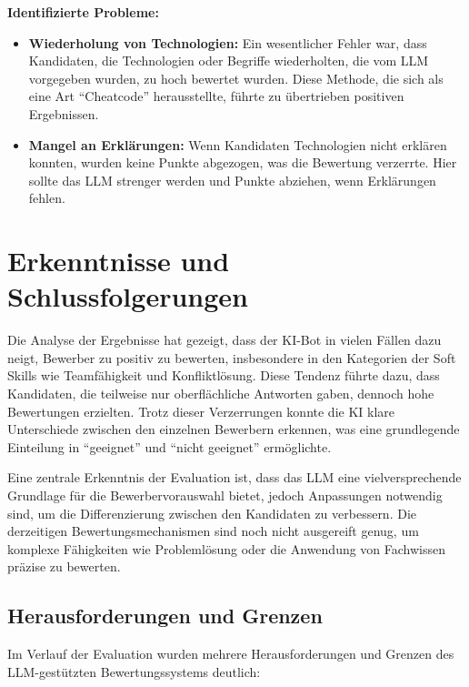 \textbf{Identifizierte Probleme:}

\begin{itemize}
    \item \textbf{Wiederholung von Technologien:} Ein wesentlicher Fehler war, dass Kandidaten, die Technologien oder Begriffe wiederholten, die vom \acs{LLM} vorgegeben wurden, zu hoch bewertet wurden. Diese Methode, die sich als eine Art ``Cheatcode''  herausstellte, führte zu übertrieben positiven Ergebnissen.
    \item \textbf{Mangel an Erklärungen:} Wenn Kandidaten Technologien nicht erklären konnten, wurden keine Punkte abgezogen, was die Bewertung verzerrte. Hier sollte das \acs{LLM} strenger werden und Punkte abziehen, wenn Erklärungen fehlen.
\end{itemize}

\section{Erkenntnisse und Schlussfolgerungen}

Die Analyse der Ergebnisse hat gezeigt, dass der \acs{KI}-Bot in vielen Fällen dazu neigt, Bewerber zu positiv zu bewerten, insbesondere in den Kategorien der Soft Skills wie Teamfähigkeit und Konfliktlösung. Diese Tendenz führte dazu, dass Kandidaten, die teilweise nur oberflächliche Antworten gaben, dennoch hohe Bewertungen erzielten. Trotz dieser Verzerrungen konnte die \acs{KI} klare Unterschiede zwischen den einzelnen Bewerbern erkennen, was eine grundlegende Einteilung in \enquote{geeignet} und \enquote{nicht geeignet} ermöglichte.

Eine zentrale Erkenntnis der Evaluation ist, dass das \acs{LLM} eine vielversprechende Grundlage für die Bewerbervorauswahl bietet, jedoch Anpassungen notwendig sind, um die Differenzierung zwischen den Kandidaten zu verbessern. Die derzeitigen Bewertungsmechanismen sind noch nicht ausgereift genug, um komplexe Fähigkeiten wie Problemlösung oder die Anwendung von Fachwissen präzise zu bewerten.

\subsection{Herausforderungen und Grenzen}

Im Verlauf der Evaluation wurden mehrere Herausforderungen und Grenzen des \acs{LLM}-gestützten Bewertungssystems deutlich:

